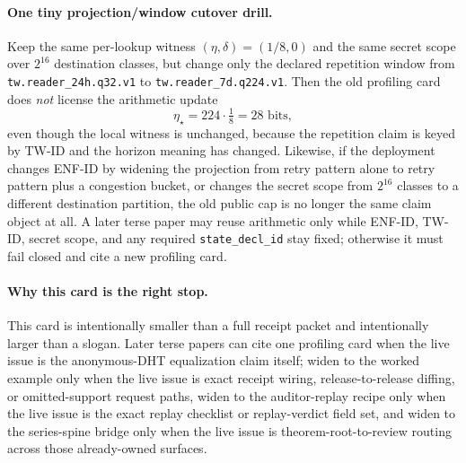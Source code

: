 \documentclass[11pt]{article}
\begin{document}
\paragraph{One tiny projection/window cutover drill.}
Keep the same per-lookup witness $(\eta,\delta)=(1/8,0)$ and the same secret scope over $2^{16}$ destination classes, but change only the declared repetition window from \texttt{tw.reader\_24h.q32.v1} to \texttt{tw.reader\_7d.q224.v1}.
Then the old profiling card does \emph{not} license the arithmetic update
\[
\eta_\star = 224\cdot \tfrac18 = 28 \text{ bits},
\]
even though the local witness is unchanged, because the repetition claim is keyed by TW-ID and the horizon meaning has changed.
Likewise, if the deployment changes ENF-ID by widening the projection from retry pattern alone to retry pattern plus a congestion bucket, or changes the secret scope from $2^{16}$ classes to a different destination partition, the old public cap is no longer the same claim object at all.
A later terse paper may reuse arithmetic only while ENF-ID, TW-ID, secret scope, and any required \texttt{state\_decl\_id} stay fixed; otherwise it must fail closed and cite a new profiling card.

\paragraph{Why this card is the right stop.}
This card is intentionally smaller than a full receipt packet and intentionally larger than a slogan.
Later terse papers can cite one profiling card when the live issue is the anonymous-DHT equalization claim itself; widen to the worked example only when the live issue is exact receipt wiring, release-to-release diffing, or omitted-support request paths, widen to the auditor-replay recipe only when the live issue is the exact replay checklist or replay-verdict field set, and widen to the series-spine bridge only when the live issue is theorem-root-to-review routing across those already-owned surfaces.\cite{series:workedexample,series:replayrecipe,series:seriesspines}
\end{document}
